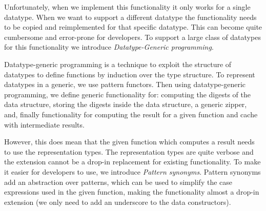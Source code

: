 




Unfortunately, when we implement this functionality it only works for a single datatype. When we want to support a different datatype the functionality needs to be copied and reimplemented for that specific datatype. This can become quite cumbersome and error-prone for developers. To support a large class of datatypes for this functionality we introduce \textit{Datatype-Generic programming}.

Datatype-generic programming is a technique to exploit the structure of datatypes to define functions by induction over the type structure. To represent datatypes in a generic, we use pattern functors. Then using datatype-generic programming, we define generic functionality for: computing the digests of the data structure, storing the digests inside the data structure, a generic zipper, and, finally functionality for computing the result for a given function and cache with intermediate results. 

However, this does mean that the given function which computes a result needs to use the representation types. The representation types are quite verbose and the extension cannot be a drop-in replacement for existing functionality. To make it easier for developers to use, we introduce \textit{Pattern synonyms}\cite*{pickering2016pattern}. Pattern synonyms add an abstraction over patterns, which can be used to simplify the case expressions used in the given function, making the functionality almost a drop-in extension (we only need to add an underscore to the data constructors). 


